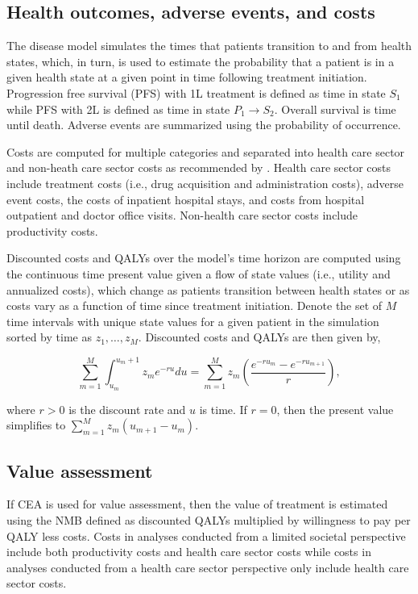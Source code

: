 \documentclass[11pt,final,fleqn]{article}\usepackage[]{graphicx}\usepackage[]{color}
\theoremstyle{plain}
\begin{document}
{\subsection{Health outcomes, adverse events, and costs}
The disease model simulates the times that patients transition to and from health states, which, in turn, is used to estimate the probability that a patient is in a given health state at a given point in time following treatment initiation. Progression free survival (PFS) with 1L treatment is defined as time in state $S_1$ while PFS with 2L is defined as time in state $P_1 \rightarrow S_2$. Overall survival is time until death. Adverse events are summarized using the probability of occurrence.  

Costs are computed for multiple categories and separated into health care sector and non-heath care sector costs as recommended by \citet{sanders2016recommendations}. Health care sector costs include treatment costs (i.e., drug acquisition and administration costs), adverse event costs, the costs of inpatient hospital stays, and costs from hospital outpatient and doctor office visits. Non-health care sector costs include productivity costs.

Discounted costs and QALYs over the model's time horizon are computed using the continuous time present value given a flow of state values (i.e., utility and annualized costs), which change as patients transition between health states or as costs vary as a function of time since treatment initiation. Denote the set of $M$ time intervals with unique state values for a given patient in the simulation sorted by time as $z_1,\ldots, z_M$. Discounted costs and QALYs are then given by,  

\begin{equation} \label{eqn:pv}
\sum_{m = 1}^M \int_{u_m}^{u_m+1} z_me^{-ru}du = \sum_{m = 1}^M z_m \left(\frac{e^{-r{u_{m}}} - e^{-r{u_{m+1}}}}{r}\right),
\end{equation}

where $r > 0$ is the discount rate and $u$ is time. If $r = 0$, then the present value simplifies to $\sum_{m = 1}^M z_m(u_{m+1} - u_{m})$. 

\subsection{Value assessment} \label{subsec:outcomes-value-assessment}
If CEA is used for value assessment, then the value of treatment is estimated using the NMB defined as discounted QALYs multiplied by willingness to pay per QALY less costs. Costs in analyses conducted from a limited societal perspective include both productivity costs and health care sector costs while costs in analyses conducted from a health care sector perspective only include health care sector costs. 

}
\end{document}
